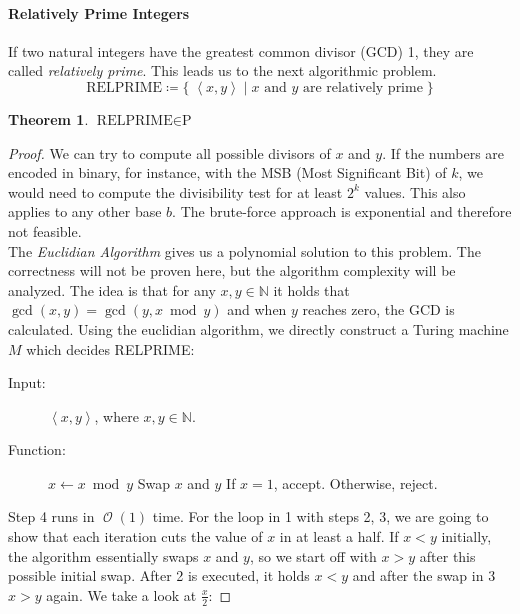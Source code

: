 \documentclass[10pt,fleqn]{article}
\theoremstyle{definition}
\newtheorem{theorem}{Theorem}
\theoremstyle{remark}
\newcommand{\pclass}{\text{P}}
\newcommand{\relprimeprob}{\text{RELPRIME}}
\newcommand{\lpp}{\left \langle}
\newcommand{\rpp}{\right \rangle}
\newcommand{\enc}[1]{\lpp #1 \rpp}
\DeclareMathOperator{\onot}{\mathcal{O}}
\begin{document}
\paragraph*{Relatively Prime Integers} If two natural integers have the greatest common divisor (GCD) 1, they are called \emph{relatively prime}. This leads us to the next algorithmic problem.
\[
    \relprimeprob \coloneqq \{ \; \enc{x, y} \mid x \text{ and } y \text{ are relatively prime} \; \}
\]
\begin{theorem}
    \(\relprimeprob \in \pclass\)
\end{theorem}
\begin{proof} We can try to compute all possible divisors of \(x\) and \(y\). If the numbers are encoded in binary, for instance, with the MSB (Most Significant Bit) of \(k\), we would need to compute the divisibility test for at least \(2^k\) values. This also applies to any other base \(b\). The brute-force approach is exponential and therefore not feasible.\\

The \emph{Euclidian Algorithm} gives us a polynomial solution to this problem. The correctness will not be proven here, but the algorithm complexity will be analyzed. The idea is that for any \(x, y \in \mathbb{N}\) it holds that \(\gcd{(x, y) = \gcd{(y, x\bmod{y})}}\) and when \(y\) reaches zero, the GCD is calculated. Using the euclidian algorithm, we directly construct a Turing machine \(M\) which decides RELPRIME:

\begin{description}
    \item[Input:] \(\enc{x, y}\), where \(x, y \in \mathbb{N}\).
    \item[Function:] \phantom{}
    \begin{algorithmic}[1]
            \State \(x \gets x\bmod{y}\)
            \State Swap \(x\) and \(y\)
        \EndWhile
        \State If \(x = 1\), accept. Otherwise, reject.
    \end{algorithmic}
\end{description}

Step 4 runs in \(\onot{(1)}\) time. For the loop in 1 with steps 2, 3, we are going to show that each iteration cuts the value of \(x\) in at least a half. If \(x < y\) initially, the algorithm essentially swaps \(x\) and \(y\), so we start off with \(x > y\) after this possible initial swap. After 2 is executed, it holds \(x < y\) and after the swap in 3 \(x > y\) again. We take a look at \(\frac{x}{2}\):


\end{proof}
\end{document}
